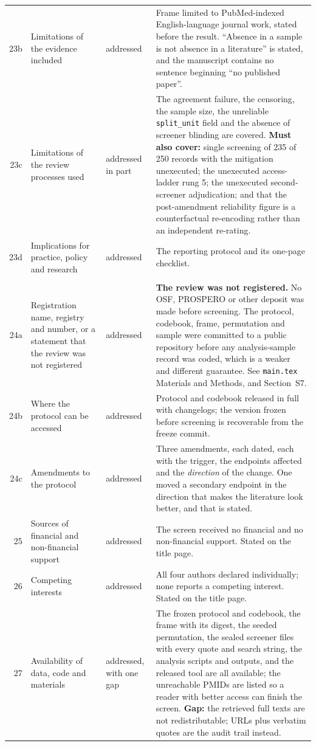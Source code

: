 \documentclass[11pt,a4paper]{article}
\begin{document}
{\begin{longtable}{@{}rL{3.5cm}L{2.6cm}L{6.2cm}@{}}
23b & Limitations of the evidence included & addressed & Frame limited to PubMed-indexed English-language journal work, stated before the result. ``Absence in a sample is not absence in a literature'' is stated, and the manuscript contains no sentence beginning ``no published paper''. \\
23c & Limitations of the review processes used & addressed in part & The agreement failure, the censoring, the sample size, the unreliable \texttt{split\_unit} field and the absence of screener blinding are covered. \textbf{Must also cover:} single screening of 235 of 250 records with the mitigation unexecuted; the unexecuted access-ladder rung 5; the unexecuted second-screener adjudication; and that the post-amendment reliability figure is a counterfactual re-encoding rather than an independent re-rating. \\
23d & Implications for practice, policy and research & addressed & The reporting protocol and its one-page checklist. \\
\addlinespace
{} \\
24a & Registration name, registry and number, or a statement that the review was not registered & addressed & \textbf{The review was not registered.} No OSF, PROSPERO or other deposit was made before screening. The protocol, codebook, frame, permutation and sample were committed to a public repository before any analysis-sample record was coded, which is a weaker and different guarantee. See \texttt{main.tex} Materials and Methods, and Section~S7. \\
24b & Where the protocol can be accessed & addressed & Protocol and codebook released in full with changelogs; the version frozen before screening is recoverable from the freeze commit. \\
24c & Amendments to the protocol & addressed & Three amendments, each dated, each with the trigger, the endpoints affected and the \emph{direction} of the change. One moved a secondary endpoint in the direction that makes the literature look better, and that is stated. \\
25 & Sources of financial and non-financial support & addressed & The screen received no financial and no non-financial support. Stated on the title page. \\
26 & Competing interests & addressed & All four authors declared individually; none reports a competing interest. Stated on the title page. \\
27 & Availability of data, code and materials & addressed, with one gap & The frozen protocol and codebook, the frame with its digest, the seeded permutation, the sealed screener files with every quote and search string, the analysis scripts and outputs, and the released tool are all available; the unreachable PMIDs are listed so a reader with better access can finish the screen. \textbf{Gap:} the retrieved full texts are not redistributable; URLs plus verbatim quotes are the audit trail instead. \\
\end{longtable}}
\end{document}
